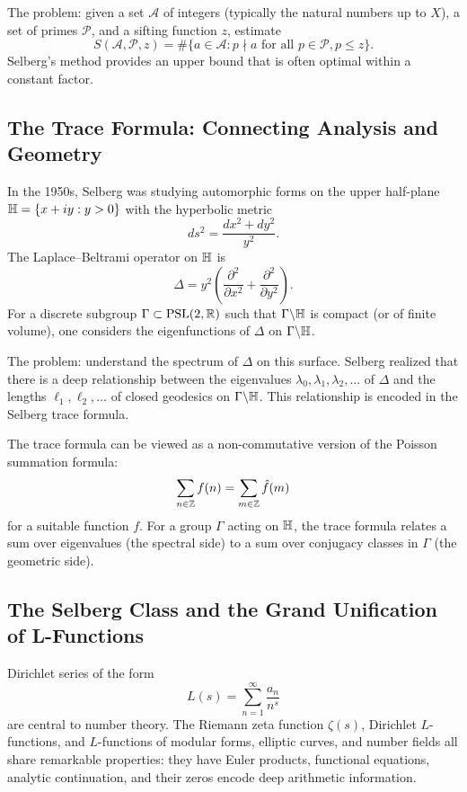 The problem: given a set \(\mathcal{A}\) of integers (typically the natural numbers up to \(X\)), a set of primes \(\mathcal{P}\), and a sifting function \(z\), estimate
\[
S(\mathcal{A}, \mathcal{P}, z) = \#\{a \in \mathcal{A} : p \nmid a \text{ for all } p \in \mathcal{P}, p \leq z\}.
\]
Selberg's method provides an upper bound that is often optimal within a constant factor.

\subsection{The Trace Formula: Connecting Analysis and Geometry}

In the 1950s, Selberg was studying automorphic forms on the upper half-plane \(\mathbb{H} = \{x+iy : y > 0\}\) with the hyperbolic metric
\[
ds^2 = \frac{dx^2 + dy^2}{y^2}.
\]
The Laplace--Beltrami operator on \(\mathbb{H}\) is
\[
\Delta = y^2 \left(\frac{\partial^2}{\partial x^2} + \frac{\partial^2}{\partial y^2}\right).
\]
For a discrete subgroup \(\Gamma \subset \operatorname{PSL}(2,\mathbb{R})\) such that \(\Gamma \backslash \mathbb{H}\) is compact (or of finite volume), one considers the eigenfunctions of \(\Delta\) on \(\Gamma \backslash \mathbb{H}\).

The problem: understand the spectrum of \(\Delta\) on this surface. Selberg realized that there is a deep relationship between the eigenvalues \(\lambda_0, \lambda_1, \lambda_2, \ldots\) of \(\Delta\) and the lengths \(\ell_1, \ell_2, \ldots\) of closed geodesics on \(\Gamma \backslash \mathbb{H}\). This relationship is encoded in the Selberg trace formula.

The trace formula can be viewed as a non-commutative version of the Poisson summation formula:
\[
\sum_{n \in \mathbb{Z}} f(n) = \sum_{m \in \mathbb{Z}} \hat f(m)
\]
for a suitable function \(f\). For a group \(\Gamma\) acting on \(\mathbb{H}\), the trace formula relates a sum over eigenvalues (the spectral side) to a sum over conjugacy classes in \(\Gamma\) (the geometric side).

\subsection{The Selberg Class and the Grand Unification of L-Functions}

Dirichlet series of the form
\[
L(s) = \sum_{n=1}^{\infty} \frac{a_n}{n^s}
\]
are central to number theory. The Riemann zeta function \(\zeta(s)\), Dirichlet \(L\)-functions, and \(L\)-functions of modular forms, elliptic curves, and number fields all share remarkable properties: they have Euler products, functional equations, analytic continuation, and their zeros encode deep arithmetic information.

